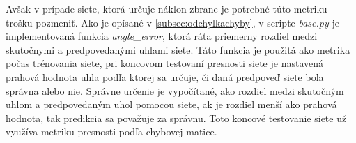 Avšak v prípade siete, ktorá určuje náklon zbrane je potrebné túto metriku trošku pozmeniť.
Ako je opísané v \ref{subsec:odchylkachyby}, v scripte \textit{base.py} je implementovaná funkcia \textit{angle\_error}, ktorá ráta priemerny rozdiel medzi
    skutočnymi a predpovedanými uhlami siete.
Táto funkcia je použitá ako metrika počas trénovania siete, pri koncovom testovaní presnosti siete je nastavená prahová hodnota uhla podľa ktorej sa určuje,
    či daná predpoveď siete bola správna alebo nie.
Správne určenie je vypočítané, ako rozdiel medzi skutočným uhlom a predpovedaným uhol pomocou siete, ak je rozdiel menší ako prahová hodnota, tak predikcia
    sa považuje za správnu.
Toto koncové testovanie siete už využíva metriku presnosti podľa chybovej matice.
